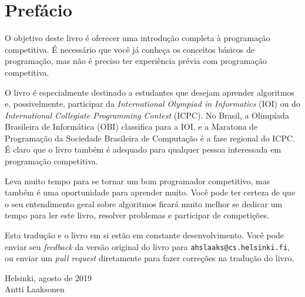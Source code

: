 \chapter*{Prefácio}

O objetivo deste livro é oferecer uma introdução completa à programação competitiva. É necessário que você já conheça os conceitos básicos de programação, mas não é preciso ter experiência prévia com programação competitiva.

O livro é especialmente destinado a estudantes que desejam aprender algoritmos e, possivelmente, participar da \emph{International Olympiad in Informatics} (IOI) ou do \emph{International Collegiate Programming Contest} (ICPC). No Brasil, a Olimpíada Brasileira de Informática (OBI) classifica para a IOI, e a Maratona de Programação da Sociedade Brasileira de Computação é a fase regional do ICPC. É claro que o livro também é adequado para qualquer pessoa interessada em programação competitiva.

Leva muito tempo para se tornar um bom programador competitivo, mas também é uma oportunidade para aprender muito. Você pode ter certeza de que o seu entendimento geral sobre algoritmos ficará muito melhor se dedicar um tempo para ler este livro, resolver problemas e participar de competições.

Esta tradução e o livro em si estão em constante desenvolvimento. Você pode enviar seu \emph{feedback} da versão original do livro para
\texttt{ahslaaks@cs.helsinki.fi}, ou enviar um \emph{pull request} diretamente para fazer correções na tradução do livro.

\begin{flushright}
Helsinki, agosto de 2019 \\
Antti Laaksonen
\end{flushright}
